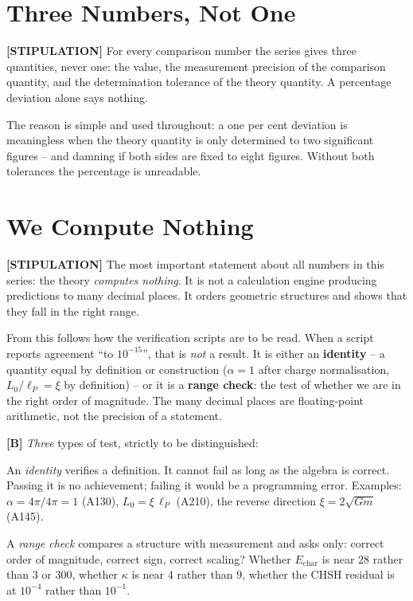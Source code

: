 \section{Three Numbers, Not One}

\textbf{[STIPULATION]} For every comparison number the series gives three
quantities, never one: the value, the measurement precision of the comparison
quantity, and the determination tolerance of the theory quantity. A percentage
deviation alone says nothing.

The reason is simple and used throughout: a one per cent deviation is meaningless
when the theory quantity is only determined to two significant figures -- and
damning if both sides are fixed to eight figures. Without both tolerances the
percentage is unreadable.

\section{We Compute Nothing}

\textbf{[STIPULATION]} The most important statement about all numbers in this
series: the theory \emph{computes nothing}. It is not a calculation engine
producing predictions to many decimal places. It orders geometric structures and
shows that they fall in the right range.

From this follows how the verification scripts are to be read. When a script
reports agreement ``to $10^{-15}$'', that is \emph{not} a result. It is either
an \textbf{identity} -- a quantity equal by definition or construction ($\alpha = 1$
after charge normalisation, $L_0/\ell_P = \xi$ by definition) -- or it is a
\textbf{range check}: the test of whether we are in the right order of magnitude.
The many decimal places are floating-point arithmetic, not the precision of a
statement.

\textbf{[B]} \emph{Three} types of test, strictly to be distinguished:

An \emph{identity} verifies a definition. It cannot fail as long as the algebra
is correct. Passing it is no achievement; failing it would be a programming error.
Examples: $\alpha = 4\pi/4\pi = 1$ (A130), $L_0 = \xi\,\ell_P$ (A210), the
reverse direction $\xi = 2\sqrt{Gm}$ (A145).

A \emph{range check} compares a structure with measurement and asks only: correct
order of magnitude, correct sign, correct scaling? Whether $E_\text{char}$ is near
$28$ rather than $3$ or $300$, whether $\kappa$ is near $4$ rather than $9$,
whether the CHSH residual is at $10^{-4}$ rather than $10^{-1}$.

